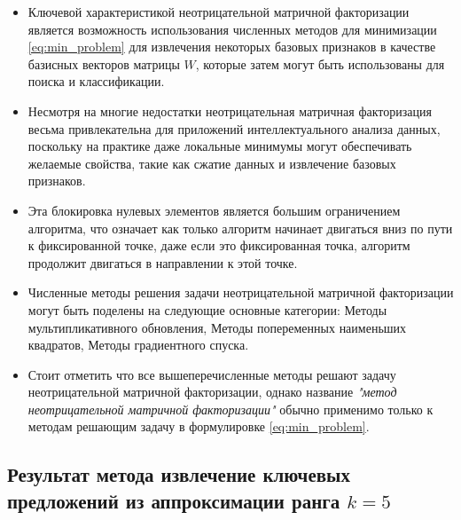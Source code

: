 \begin{itemize}
  \item Ключевой характеристикой неотрицательной матричной факторизации является возможность
  использования численных методов для минимизации \eqref{eq:min_problem}
  для извлечения некоторых базовых признаков в качестве базисных векторов матрицы $W​$,
  которые затем могут быть использованы для поиска и классификации.
  \item Несмотря на многие недостатки неотрицательная матричная факторизация весьма привлекательна для приложений интеллектуального анализа данных,
  поскольку на практике даже локальные минимумы могут обеспечивать желаемые свойства, такие как сжатие данных и извлечение базовых признаков.
  \item Эта блокировка нулевых элементов является большим ограничением алгоритма,
  что означает как только алгоритм начинает двигаться вниз по пути к фиксированной точке,
  даже если это  фиксированная точка, алгоритм продолжит двигаться в направлении к этой точке.
  \item Численные методы решения задачи неотрицательной матричной факторизации могут быть поделены на следующие основные категории: 	Методы мультипликативного обновления, 	Методы попеременных наименьших квадратов, 	Методы градиентного спуска.
  \item Стоит отметить что все вышеперечисленные методы решают задачу неотрицательной матричной факторизации,
однако название \textit{"метод неотрицательной матричной факторизации"} обычно применимо только к методам решающим задачу в формулировке \eqref{eq:min_problem}.
\end{itemize}


\newpage


\subsection{Результат метода извлечение ключевых предложений из аппроксимации ранга $k = 5$}

